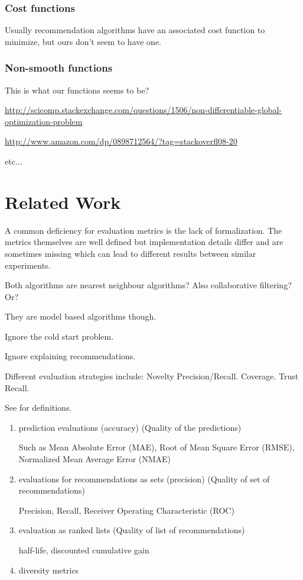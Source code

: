 \subsubsection{Cost functions}

Usually recommendation algorithms have an associated cost function to minimize, but ours don't seem to have one.


\subsubsection{Non-smooth functions}

This is what our functions seems to be?

\url{http://scicomp.stackexchange.com/questions/1506/non-differentiable-global-optimization-problem}

\url{http://www.amazon.com/dp/0898712564/?tag=stackoverfl08-20}

etc...


\section{Related Work}

A common deficiency for evaluation metrics is the lack of formalization. The metrics themselves are well defined but implementation details differ and are sometimes missing which can lead to different results between similar experiments.


Both algorithms are nearest neighbour algorithms? Also collaborative filtering? Or?

They are model based algorithms though.

Ignore the cold start problem.

Ignore explaining recommendations.

Different evaluation strategies include: Novelty Precision/Recall. Coverage. Trust Recall.

See \citep{bobadilla2013recommender} for definitions.

\begin{enumerate}
    \item prediction evaluations (accuracy) (Quality of the predictions)

        Such as Mean Absolute Error (MAE), Root of Mean Square Error (RMSE), Normalized Mean Average Error (NMAE)

    \item evaluations for recommendations as sets (precision) (Quality of set of recommendations)

        Precision, Recall, Receiver Operating Characteristic (ROC)

    \item evaluation as ranked lists (Quality of list of recommendations)

        half-life, discounted cumulative gain

    \item diversity metrics
\end{enumerate}


